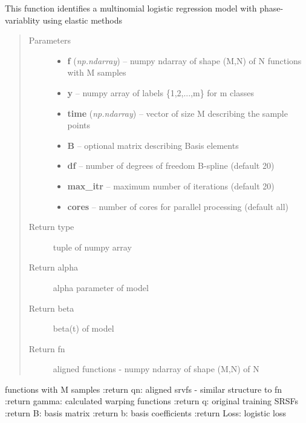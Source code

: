 \documentclass[letterpaper,10pt,english]{sphinxmanual}
\begin{document}
\begin{fulllineitems}
\label{regression:regression.elastic_mlogistic}
This function identifies a multinomial logistic regression model with
phase-variablity using elastic methods
\begin{quote}\begin{description}
\item[{Parameters}] \leavevmode\begin{itemize}
\item {} 
\textbf{f} (\emph{np.ndarray}) -- numpy ndarray of shape (M,N) of N functions with M samples

\item {} 
\textbf{y} -- numpy array of labels \{1,2,...,m\} for m classes

\item {} 
\textbf{time} (\emph{np.ndarray}) -- vector of size M describing the sample points

\item {} 
\textbf{B} -- optional matrix describing Basis elements

\item {} 
\textbf{df} -- number of degrees of freedom B-spline (default 20)

\item {} 
\textbf{max\_itr} -- maximum number of iterations (default 20)

\item {} 
\textbf{cores} -- number of cores for parallel processing (default all)

\end{itemize}

\item[{Return type}] \leavevmode
tuple of numpy array

\item[{Return alpha}] \leavevmode
alpha parameter of model

\item[{Return beta}] \leavevmode
beta(t) of model

\item[{Return fn}] \leavevmode
aligned functions - numpy ndarray of shape (M,N) of N

\end{description}\end{quote}

functions with M samples
:return qn: aligned srvfs - similar structure to fn
:return gamma: calculated warping functions
:return q: original training SRSFs
:return B: basis matrix
:return b: basis coefficients
:return Loss: logistic loss

\end{fulllineitems}
\end{document}
